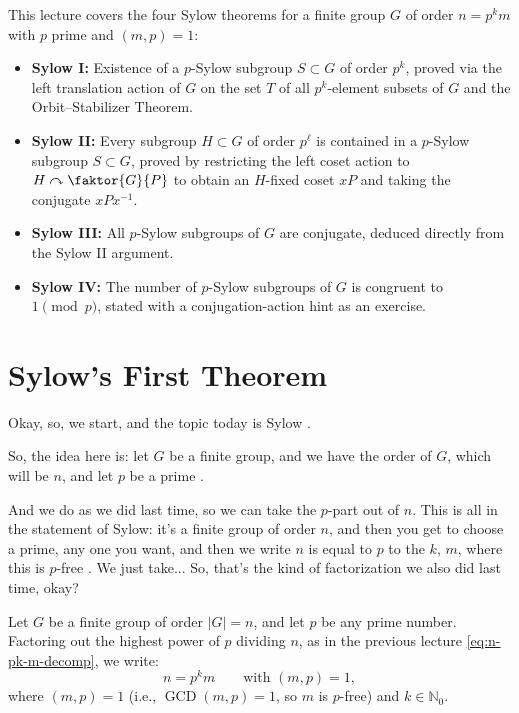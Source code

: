 \begin{overview}
This lecture covers the four Sylow theorems for a finite group $G$ of order $n = p^k m$ with $p$ prime and $(m, p) = 1$:
\begin{itemize}
    \item \textbf{Sylow I:} Existence of a $p$-Sylow subgroup $S \subset G$ of order $p^k$, proved via the left translation action of $G$ on the set $T$ of all $p^k$-element subsets of $G$ and the Orbit--Stabilizer Theorem.
    \item \textbf{Sylow II:} Every subgroup $H \subset G$ of order $p^\ell$ is contained in a $p$-Sylow subgroup $S \subset G$, proved by restricting the left coset action to $H \curvearrowright \faktor{G}{P}$ to obtain an $H$-fixed coset $x P$ and taking the conjugate $x P x^{-1}$.
    \item \textbf{Sylow III:} All $p$-Sylow subgroups of $G$ are conjugate, deduced directly from the Sylow II argument.
    \item \textbf{Sylow IV:} The number of $p$-Sylow subgroups of $G$ is congruent to $1 \pmod p$, stated with a conjugation-action hint as an exercise.
\end{itemize}
\end{overview}

\section{Sylow's First Theorem}

\begin{speech}[00:00:00 - 00:00:53]
Okay, so, we start, and the topic today is Sylow .

So, the idea here is: let $G$ be a finite group, and we have the order of $G$, which will be $n$, and let $p$ be a prime .

And we do as we did last time, so we can take the $p$-part out of $n$. This is all in the statement of Sylow: it's a finite group of order $n$, and then you get to choose a prime, any one you want, and then we write $n$ is equal to $p$ to the $k$, $m$, where this is $p$-free . We just take... So, that's the kind of factorization we also did last time, okay?
\end{speech}

\begin{content}
Let $G$ be a finite group of order $|G| = n$, and let $p$ be any prime number. Factoring out the highest power of $p$ dividing $n$, as in the previous lecture \eqref{eq:n-pk-m-decomp}, we write:
\begin{equation}\label{eq:sylow-order-factorization}
n = p^k m \qquad \text{with } (m, p) = 1,
\end{equation}
where $(m, p) = 1$ (i.e., $\operatorname{GCD}(m, p) = 1$, so $m$ is $p$-free) and $k \in \mathbb{N}_0$.
\end{content}

